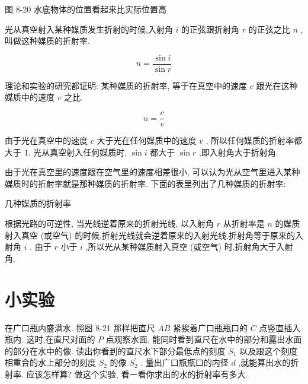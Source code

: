 \documentclass[10pt]{article}
\begin{document}
图 8-20 水底物体的位置看起来比实际位置高

光从真空射入某种媒质发生折射的时候,入射角 \(i\) 的正弦跟折射角 \(r\) 的正弦之比 \(n\) ,叫做这种媒质的折射率.

\[
n = \frac{\sin i}{\sin r}
\]

理论和实验的研究都证明: 某种媒质的折射率, 等于在真空中的速度 \(c\) 跟光在这种媒质中的速度 \(v\) 之比.

\[
n = \frac{c}{v}
\]

由于光在真空中的速度 \(c\) 大于光在任何媒质中的速度 \(v\) , 所以任何媒质的折射率都大于 1. 光从真空射入任何媒质时, \(\sin i\) 都大于 \(\sin r\) ,即入射角大于折射角.

由于光在真空里的速度跟在空气里的速度相差很小, 可以认为光从空气里进入某种媒质时的折射率就是那种媒质的折射率. 下面的表里列出了几种媒质的折射率:

几种媒质的折射率

\begin{center}
\end{center}

根据光路的可逆性, 当光线逆着原来的折射光线, 以入射角 \(r\) 从折射率是 \(n\) 的媒质射入真空 (或空气) 的时候,折射光线就会逆着原来的入射光线,折射角等于原来的入射角 \(i\) . 由于 \(r\) 小于 \(i\) ,所以光从某种媒质射入真空 (或空气) 时,折射角大于入射角.

\section*{小实验}

在广口瓶内盛满水. 照图 8-21 那样把直尺 \({AB}\) 紧挨着广口瓶瓶口的 \(C\) 点竖直插入瓶内. 这时,在直尺对面的 \(P\) 点观察水面, 能同时看到直尺在水中的部分和露出水面的部分在水中的像. 读出你看到的直尺水下部分最低点的刻度 \({S}_{1}\) 以及跟这个刻度相重合的水上部分的刻度 \({S}_{2}\) 的像 \({S}_{2}^{\prime }\) . 量出广口瓶瓶口的内径 \(d\) ,就能算出水的折射率. 应该怎样算? 做这个实验, 看一看你求出的水的折射率有多大.
\end{document}
